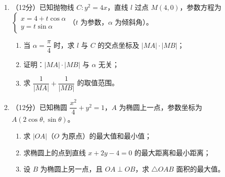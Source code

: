 \documentclass[12pt, a4paper]{ctexart}
\begin{document}
\begin{enumerate}[resume]
\item （12分）已知抛物线 $C: y^2 = 4x$，直线 $l$ 过点 $M(4, 0)$，参数方程为 $\begin{cases} x = 4 + t\cos\alpha \\ y = t\sin\alpha \end{cases}$（$t$ 为参数，$\alpha$ 为倾斜角）。
\begin{enumerate}[label=(\arabic*)]
\item 当 $\alpha = \dfrac{\pi}{4}$ 时，求 $l$ 与 $C$ 的交点坐标及 $|MA| \cdot |MB|$；
\item 证明：$|MA| \cdot |MB|$ 与 $\alpha$ 无关；
\item 求 $\dfrac{1}{|MA|} + \dfrac{1}{|MB|}$ 的取值范围。
\end{enumerate}

\item （12分）已知椭圆 $\dfrac{x^2}{4} + y^2 = 1$，$A$ 为椭圆上一点，参数坐标为 $A(2\cos\theta, \sin\theta)$。
\begin{enumerate}[label=(\arabic*)]
\item 求 $|OA|$（$O$ 为原点）的最大值和最小值；
\item 求椭圆上的点到直线 $x + 2y - 4 = 0$ 的最大距离和最小距离；
\item 设 $B$ 为椭圆上另一点，且 $OA \perp OB$，求 $\triangle OAB$ 面积的最大值。
\end{enumerate}

\end{enumerate}
\end{document}
